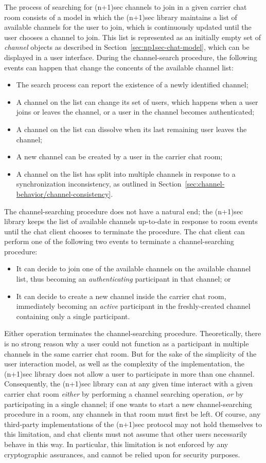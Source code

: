 \documentclass{article}
\begin{document}
The process of searching for (n+1)sec channels to join in a given carrier chat room consists of a model in which the (n+1)sec library maintains a list of available channels for the user to join, which is continuously updated until the user chooses a channel to join.
This list is represented as an initially empty set of \emph{channel} objects as described in Section~\ref{sec:np1sec-chat-model}, which can be displayed in a user interface.
During the channel-search procedure, the following events can happen that change the concents of the available channel list:
\begin{itemize}
\item The search process can report the existence of a newly identified channel;
\item A channel on the list can change its set of users, which happens when a user joins or leaves the channel, or a user in the channel becomes authenticated;
\item A channel on the list can dissolve when its last remaining user leaves the channel;
\item A new channel can be created by a user in the carrier chat room;
\item A channel on the list has split into multiple channels in response to a synchronization inconsistency, as outlined in Section~\ref{sec:channel-behavior/channel-consistency}.
\end{itemize}
The channel-searching procedure does not have a natural end; the (n+1)sec library keeps the list of available channels up-to-date in response to room events until the chat client chooses to terminate the procedure.
The chat client can perform one of the following two events to terminate a channel-searching procedure:
\begin{itemize}
\item It can decide to join one of the available channels on the available channel list, thus becoming an \emph{authenticating} participant in that channel; or
\item It can decide to create a new channel inside the carrier chat room, immediately becoming an \emph{active} participant in the freshly-created channel containing only a single participant.
\end{itemize}
Either operation terminates the channel-searching procedure.
Theoretically, there is no strong reason why a user could not function as a participant in multiple channels in the same carrier chat room.
But for the sake of the simplicity of the user interaction model, as well as the complexity of the implementation, the (n+1)sec library does not allow a user to participate in more than one channel.
Consequently, the (n+1)sec library can at any given time interact with a given carrier chat room \emph{either} by performing a channel searching operation, \emph{or} by participating in a single channel; if one wants to start a new channel-searching procedure in a room, any channels in that room must first be left.
Of course, any third-party implementations of the (n+1)sec protocol may not hold themselves to this limitation, and chat clients must not assume that other users necessarily behave in this way.
In particular, this limitation is not enforced by any cryptographic assurances, and cannot be relied upon for security purposes.
\end{document}
